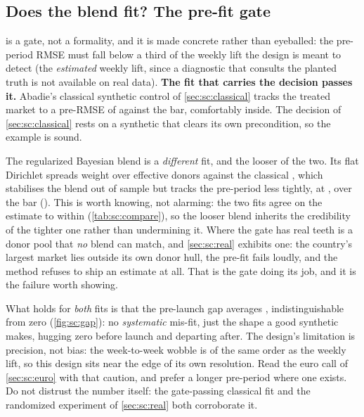 \subsection*{Does the blend fit? The pre-fit gate}

 is a gate, not a formality, and it is made concrete rather than eyeballed: the
pre-period RMSE must fall below a third of the weekly lift the design is meant to detect (the
\emph{estimated} weekly lift, since a diagnostic that consults the planted truth is not available on
real data). \textbf{The fit that carries the decision passes it.} Abadie's classical synthetic
control of \cref{sec:sc:classical} tracks the treated market to a pre-RMSE of \keur{\nbSevenClPreRmse}
against the \keur{\nbSevenGateRef} bar, comfortably inside. The decision of \cref{sec:sc:classical}
rests on a synthetic that clears its own precondition, so the example is sound.

The regularized Bayesian blend is a \emph{different} fit, and the looser of the two. Its flat
Dirichlet spreads weight over \nbSevenBayesEffDonors{} effective donors against the classical
\nbSevenClEffDonors{}, which stabilises the blend out of sample but tracks the pre-period less
tightly, at \keur{\nbSevenBayesPreRmse}, over the bar (\textbf{\nbSevenGate}). This is worth knowing,
not alarming: the two fits agree on the estimate to within \keur{\nbSevenEstDiff}
(\cref{tab:sc:compare}), so the looser blend inherits the credibility of the tighter one rather than
undermining it. Where the gate has real teeth is a donor pool that \emph{no} blend can match, and
\cref{sec:sc:real} exhibits one: the country's largest market lies outside its own donor hull, the
pre-fit fails loudly, and the method refuses to ship an estimate at all. That is the gate doing its
job, and it is the failure worth showing.

What holds for \emph{both} fits is that the pre-launch gap averages \keur{\nbSevenPreGapMean},
indistinguishable from zero (\cref{fig:sc:gap}): no \emph{systematic} mis-fit, just the shape a good
synthetic makes, hugging zero before launch and departing after. The design's limitation is precision,
not bias: the week-to-week wobble is of the same order as the weekly lift, so this design sits near
the edge of its own resolution. Read the euro call of \cref{sec:sc:euro} with that caution, and
prefer a longer pre-period where one exists. Do not distrust the number itself: the gate-passing
classical fit and the randomized experiment of \cref{sec:sc:real} both corroborate it.

